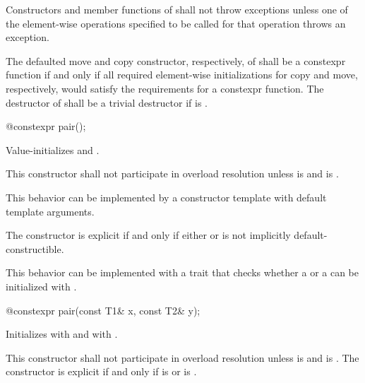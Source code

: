 \pnum
Constructors and member functions of  shall not throw exceptions unless one of
the element-wise operations specified to be called for that operation
throws an exception.

\pnum
The defaulted move and copy constructor, respectively, of  shall
be a constexpr function if and only if all required element-wise
initializations for copy and move, respectively, would satisfy the
requirements for a constexpr function.
The destructor of  shall be a trivial destructor if
is .

%
\begin{itemdecl}
@\EXPLICIT@ constexpr pair();
\end{itemdecl}

\begin{itemdescr}
\pnum
\effects
Value-initializes  and .

\pnum
\remarks
This constructor shall not participate in overload resolution unless
 is  and
 is .
\begin{note} This behavior can be implemented by a constructor template
with default template arguments. \end{note}
The constructor is explicit if and only if either  or
 is not implicitly default-constructible.
\begin{note} This behavior can be implemented with a trait that checks
whether a  or a 
can be initialized with \tcode{\{\}}. \end{note}
\end{itemdescr}

%
\begin{itemdecl}
@\EXPLICIT@ constexpr pair(const T1& x, const T2& y);
\end{itemdecl}

\begin{itemdescr}
\pnum
\effects
Initializes  with  and  with .

\pnum
\remarks This constructor shall not participate in overload resolution
unless  is  and
 is .
The constructor is explicit if and only if
 is  or
 is .
\end{itemdescr}

